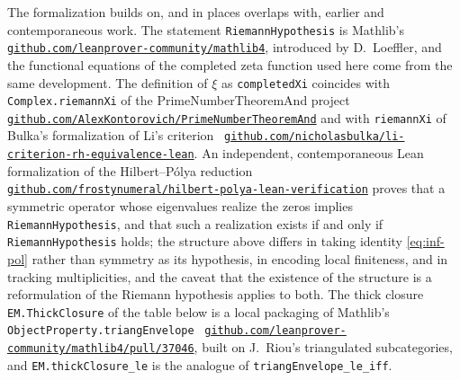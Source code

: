 \documentclass[11pt]{amsart}
\theoremstyle{plain}
\theoremstyle{definition}
\theoremstyle{remark}
\numberwithin{equation}{section}
\newcommand{\ghlink}[2]{\cite{#1}\,%
  \href{https://github.com/#2}{\nolinkurl{github.com/#2}}}
\begin{document}
The formalization builds on, and in places overlaps with, earlier and
contemporaneous work. The statement \texttt{RiemannHypothesis} is
Mathlib's \ghlink{Mathlib2026RiemannHypothesis}{leanprover-community/mathlib4},
introduced by D.~Loeffler, and the functional equations of the completed
zeta function used here come from the same development. The definition
of $\xi$ as
\texttt{completedXi} coincides with \texttt{Complex.riemannXi} of the
PrimeNumberTheoremAnd project
\ghlink{Cipollina2026CompletedXi}{AlexKontorovich/PrimeNumberTheoremAnd}
and with \texttt{riemannXi} of Bulka's formalization of Li's criterion
\ghlink{Bulka2026LiCriterionLean}%
{nicholasbulka/li-criterion-rh-equivalence-lean}. An independent,
contemporaneous Lean formalization of the Hilbert--P\'olya reduction
\ghlink{Csillag2026HilbertPolyaLean}%
{frostynumeral/hilbert-polya-lean-verification} proves that a
symmetric operator whose eigenvalues realize the zeros implies
\texttt{RiemannHypothesis}, and that such a realization exists if and
only if \texttt{RiemannHypothesis} holds; the structure above differs
in taking identity \eqref{eq:inf-pol} rather than symmetry as its
hypothesis, in encoding local finiteness, and in tracking
multiplicities, and the caveat that the existence of the structure is a
reformulation of the Riemann hypothesis applies to both. The thick
closure \texttt{EM.ThickClosure} of the table below is a local
packaging of Mathlib's \texttt{ObjectProperty.triangEnvelope}
\ghlink{Mathlib2026TriangEnvelope}%
{leanprover-community/mathlib4/pull/37046}, built on J.~Riou's
triangulated subcategories, and \texttt{EM.thickClosure\_le} is the
analogue of \texttt{triangEnvelope\_le\_iff}.
\end{document}
